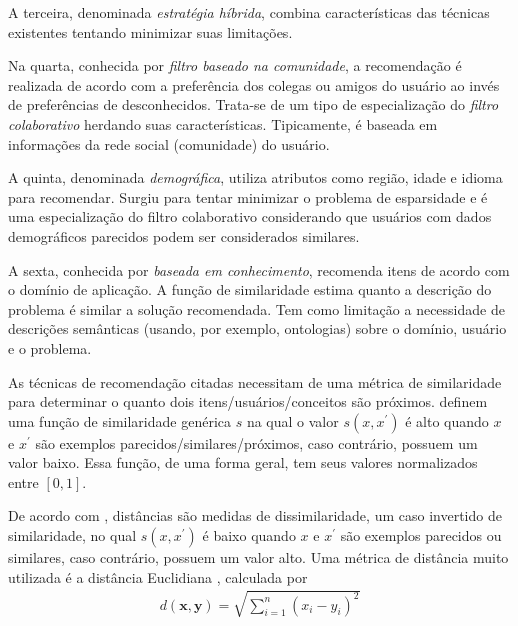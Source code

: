 A terceira, denominada \emph{estratégia híbrida}, combina características das técnicas existentes tentando minimizar suas limitações.

Na quarta, conhecida por \emph{filtro baseado na comunidade}, a recomendação é realizada de acordo com a preferência dos colegas ou amigos do usuário ao invés de preferências de desconhecidos. Trata-se de um tipo de especialização do \emph{filtro colaborativo} herdando suas características. Tipicamente, é baseada em informações da rede social (comunidade) do usuário.

A quinta, denominada \emph{demográfica}, utiliza atributos como região, idade e idioma para recomendar. Surgiu para tentar minimizar o problema de esparsidade e é uma especialização do filtro colaborativo considerando que usuários com dados demográficos parecidos podem ser considerados similares.

A sexta, conhecida por \emph{baseada em conhecimento}, recomenda itens de acordo com o domínio de aplicação. A função de similaridade estima quanto a descrição do problema é similar a solução recomendada. Tem como limitação a necessidade de descrições semânticas (usando, por exemplo, ontologias) sobre o domínio, usuário e o problema.

As técnicas de recomendação citadas necessitam de uma métrica de similaridade para determinar o quanto dois itens/usuários/conceitos são próximos.  definem uma função de similaridade genérica \(s\) na qual o valor \(s(x,x^{'})\) é alto quando \(x\) e \(x^{'}\) são exemplos parecidos/similares/próximos, caso contrário, possuem um valor baixo. Essa função, de uma forma geral, tem seus valores normalizados entre \([0, 1]\).

De acordo com , distâncias são medidas de dissimilaridade, um caso invertido de similaridade, no qual \(s(x,x^{'})\) é baixo quando \(x\) e \(x^{'}\) são exemplos parecidos ou similares, caso contrário, possuem um valor alto. Uma métrica de distância muito utilizada é a distância Euclidiana \cite{Deza2009}, calculada por
\begin{align}
d(\mathbf{x},\mathbf{y}) = \sqrt{  \sum\limits_{i=1}^{n} (x_{i} - y_{i})^{2} } \label{dist_euclidiana}
\end{align}

